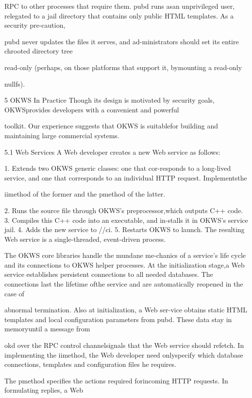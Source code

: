 RPC to other processes that require them. pubd runs asan unprivileged user, relegated to a jail directory that contains only public HTML templates. As a security pre-caution,

pubd never updates the files it serves, and ad-ministrators should set its entire chrooted directory tree

read-only (perhaps, on those platforms that support it, bymounting a read-only

nullfs).

5 OKWS In Practice
Though its design is motivated by security goals, OKWSprovides developers with a convenient and powerful

toolkit. Our experience suggests that OKWS is suitablefor building and maintaining large commercial systems.

5.1 Web Services
A Web developer creates a new Web service as follows:

1. Extends two OKWS generic classes: one that cor-responds to a long-lived service, and one that corresponds to an individual HTTP request. Implementsthe

i\Gamma i\Delta  method of the former and the p\Theta \Lambda \Xi \Pi \Sigma \Sigma method of the latter.

2. Runs the source file through OKWS's preprocessor,which outputs C++ code.
3. Compiles this C++ code into an executable, and in-stalls it in OKWS's service jail.
4. Adds the new service to /\Pi \Delta \Xi /\Lambda \Upsilon \Phi \Sigma  \Xi \Lambda \Gamma ci\Psi .
5. Restarts OKWS to launch.
The resulting Web service is a single-threaded, event-driven process.

The OKWS core libraries handle the mundane me-chanics of a service's life cycle and its connections to
OKWS helper processes. At the initialization stage,a Web service establishes persistent connections to all
needed databases. The connections last the lifetime ofthe service and are automatically reopened in the case of

abnormal termination. Also at initialization, a Web ser-vice obtains static HTML templates and local configuration parameters from pubd. These data stay in memoryuntil a message from

okd over the RPC control channelsignals that the Web service should refetch. In implementing the i\Gamma i\Delta  method, the Web developer need onlyspecify which database connections, templates and configuration files he requires.

The p\Theta \Lambda \Xi \Pi \Sigma \Sigma  method specifies the actions required forincoming HTTP requests. In formulating replies, a Web

